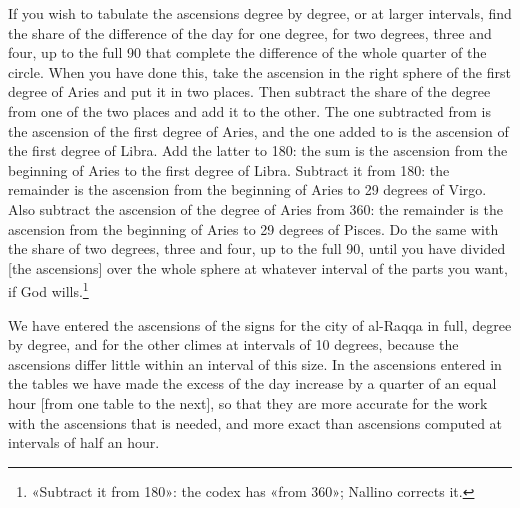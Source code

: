 \documentclass[11pt]{article}
\begin{document}
\par If you wish to tabulate the ascensions degree by degree, or at larger intervals, find the share of the difference of the day for one degree, for two degrees, three and four, up to the full 90 that complete the difference of the whole quarter of the circle. When you have done this, take the ascension in the right sphere of the first degree of Aries and put it in two places. Then subtract the share of the degree from one of the two places and add it to the other. The one subtracted from is the ascension of the first degree of Aries, and the one added to is the ascension of the first degree of Libra. Add the latter to 180: the sum is the ascension from the beginning of Aries to the first degree of Libra. Subtract it from 180: the remainder is the ascension from the beginning of Aries to 29 degrees of Virgo. Also subtract the ascension of the degree of Aries from 360: the remainder is the ascension from the beginning of Aries to 29 degrees of Pisces. Do the same with the share of two degrees, three and four, up to the full 90, until you have divided [the ascensions] over the whole sphere at whatever interval of the parts you want, if God wills.\footnote{«Subtract it from 180»: the codex has «from 360»; Nallino corrects it.}\par
\par We have entered the ascensions of the signs for the city of al-Raqqa in full, degree by degree, and for the other climes at intervals of 10 degrees, because the ascensions differ little within an interval of this size. In the ascensions entered in the tables we have made the excess of the day increase by a quarter of an equal hour [from one table to the next], so that they are more accurate for the work with the ascensions that is needed, and more exact than ascensions computed at intervals of half an hour.\par
\end{document}
